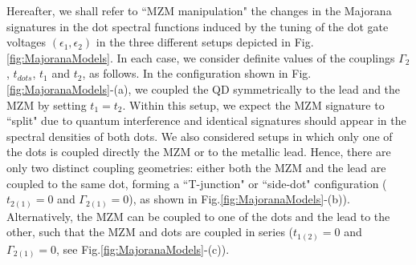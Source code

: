 \documentclass[showpacs,aps,prb,reprint,superscriptaddress]{revtex4-1}
\begin{document}
Hereafter, we shall refer to ``MZM manipulation" the changes in the Majorana signatures in the dot spectral functions induced by the tuning of the dot gate voltages $( \epsilon_1 , \epsilon_2 )$ in the three different setups depicted in Fig.\ref{fig:MajoranaModels}. In each case, we consider definite values of the couplings $\Gamma_2$, $t_{dots}$, $t_1$ and $t_2$, as follows.  In the configuration shown in Fig.\ref{fig:MajoranaModels}-(a), we coupled the QD symmetrically to the lead and the MZM by setting $t_1\!=\! t_2$.  Within this setup, we expect the MZM signature to ``split" due to quantum interference and identical signatures should appear in the spectral densities of both dots. We also considered setups in which only one of the dots is coupled directly the MZM or to the metallic lead. Hence, there are only two distinct coupling geometries: either both the MZM and the lead are coupled to the same dot, forming a ``T-junction" or ``side-dot" configuration ($t_{2(1)}\!=\!0$ and $\Gamma_{2(1)}\!=\!0$), as shown in Fig.\ref{fig:MajoranaModels}-(b)). Alternatively, the MZM can be coupled to one of the dots and the lead to the other, such that the MZM and dots are coupled in series ($t_{1(2)}\!=\!0$ and $\Gamma_{2(1)}\!=\!0$, see Fig.\ref{fig:MajoranaModels}-(c)).
\end{document}
